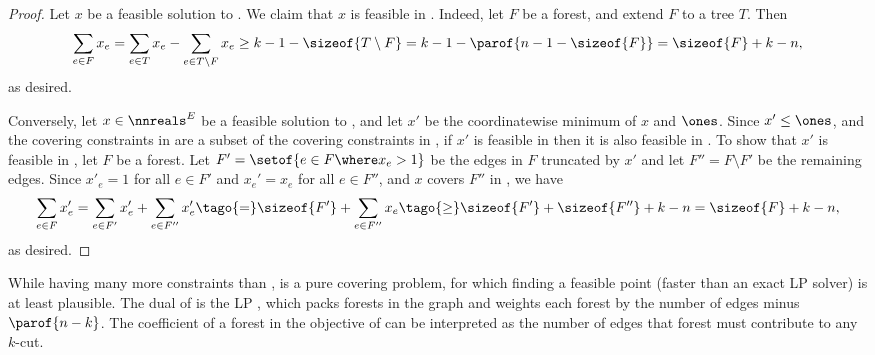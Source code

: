 \documentclass{toc}
\begin{document}
\begin{proof}
  Let $x$ be a feasible solution to . We claim that
  $x$ is feasible in . Indeed, let $F$ be a forest,
  and extend $F$ to a tree $T$. Then
  \begin{align*}
    \sum_{e \in F} x_e %
    = %
    \sum_{e \in T} x_e - \sum_{e \in T \setminus F} x_e %
    \geq                                                %
    k - 1 - \sizeof{T \setminus F}                      %
    =                                                   %
    k - 1 - \parof{n-1 - \sizeof{F}}                    %
    =                                                   %
    \sizeof{F} + k - n,
  \end{align*}
  as desired.

  Conversely, let $x \in \nnreals^E$ be a feasible solution to
  , and let $x'$ be the coordinatewise minimum of $x$
  and $\ones$. Since $x' \leq \ones$, and the covering constraints in
   are a subset of the covering constraints in
  , if $x'$ is feasible in  then it is
  also feasible in . To show that $x'$ is feasible in
  , let $F$ be a forest. Let
  $F' = \setof{e \in F \where x_e > 1}$ be the edges in $F$ truncated
  by $x'$ and let $F'' = F \setminus F'$ be the remaining edges. Since
  \tagr $x'_e = 1$ for all $e \in F'$ and $x_e' = x_e$ for all
  $e \in F''$, and \tagr $x$ covers $F''$ in , we have
  \begin{align*}
    \sum_{e \in F} x_e'          %
    =                           %
    \sum_{e \in F'} x_e' + \sum_{e \in F''} x'_e %
    \tago{=}
    \sizeof{F'} + \sum_{e \in F''} x_e %
    \tago{\geq}                                  %
    \sizeof{F'} + \sizeof{F''} + k - n    %
    =                                     %
    \sizeof{F} + k - n,
  \end{align*}
  as desired.
\end{proof}

While having many more constraints than ,
 is a pure covering problem, for which finding a
feasible point (faster than an exact LP solver) is at least
plausible. The dual of  is the LP
, which packs forests in the graph and
weights each forest by the number of edges minus $\parof{n - k}$. The
coefficient of a forest in the objective of
 can be interpreted as the number of
edges that forest must contribute to any $k$-cut.
\end{document}
